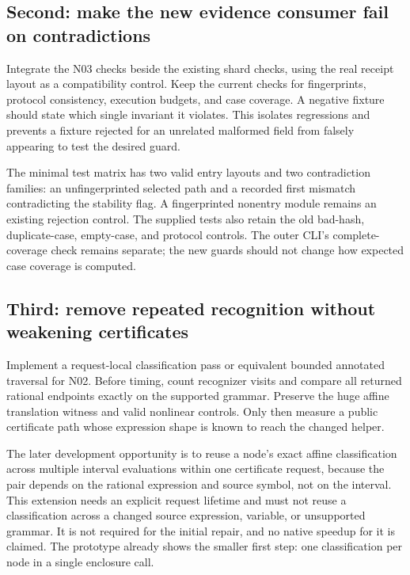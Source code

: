 \documentclass[11pt,letterpaper]{article}
\begin{document}
\subsection{Second: make the new evidence consumer fail on contradictions}

Integrate the N03 checks beside the existing shard checks, using the real receipt
layout as a compatibility control. Keep the current checks for fingerprints,
protocol consistency, execution budgets, and case coverage. A negative fixture
should state which single invariant it violates. This isolates regressions and
prevents a fixture rejected for an unrelated malformed field from falsely
appearing to test the desired guard.

The minimal test matrix has two valid entry layouts and two contradiction
families: an unfingerprinted selected path and a recorded first mismatch
contradicting the stability flag. A fingerprinted nonentry module remains an
existing rejection control. The supplied tests also
retain the old bad-hash, duplicate-case, empty-case, and protocol controls. The
outer CLI's complete-coverage check remains separate; the new guards should not
change how expected case coverage is computed.

\subsection{Third: remove repeated recognition without weakening certificates}

Implement a request-local classification pass or equivalent bounded annotated
traversal for N02. Before timing, count recognizer visits and compare all returned
rational endpoints exactly on the supported grammar. Preserve the huge affine
translation witness and valid nonlinear controls. Only then measure a public
certificate path whose expression shape is known to reach the changed helper.

The later development opportunity is to reuse a node's exact affine
classification across multiple interval evaluations within one certificate
request, because the pair depends on the rational expression and source symbol,
not on the interval. This extension needs an explicit request lifetime and must
not reuse a classification across a changed source expression, variable, or
unsupported grammar. It is not required for the initial repair, and no native
speedup for it is claimed. The prototype already shows the smaller first step:
one classification per node in a single enclosure call.
\end{document}
